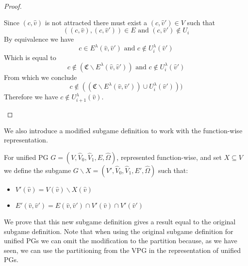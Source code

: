\begin{lemma}
\begin{proof}
\begin{itemize}
			Since $(c,\hat{v})$ is not attracted there must exist a $(c,\hat{v}') \in V$ such that 
			\[ ((c,\hat{v}),(c,\hat{v}')) \in E  \text{ and } (c,\hat{v}') \notin U_i \]
			By equivalence we have 
			\[ c \in E^\lambda(\hat{v},\hat{v}')  \text{ and } c \notin U^\lambda_i(\hat{v}') \]
			Which is equal to
			\[ c \notin (\mathfrak{C} \backslash E^\lambda(\hat{v},\hat{v}'))  \text{ and } c \notin U^\lambda_i(\hat{v}') \]
			From which we conclude
			\[ c \notin ((\mathfrak{C} \backslash E^\lambda(\hat{v},\hat{v}')) \cup U^\lambda_i(\hat{v}'))) \]
			Therefore we have $c \notin U^\lambda_{i+1}(\hat{v})$.
		\end{itemize}
	\end{proof}
\end{lemma}

We also introduce a modified subgame definition to work with the function-wise representation.
\begin{definition}
	\label{def_Usubgame}
	For unified PG $G = (V,\hat{V}_0,\hat{V}_1,E,\hat{\Omega})$, represented function-wise, and set $X \subseteq V$ we define the subgame $G \backslash X = (V',\hat{V}_0,\hat{V}_1,E',\hat{\Omega})$ such that:
	\begin{itemize}
		\item $V'(\hat{v}) = V(\hat{v}) \backslash X(\hat{v})$
		\item $E'(\hat{v},\hat{v}') = E(\hat{v},\hat{v}') \cap V'(\hat{v}) \cap V'(\hat{v}')$
	\end{itemize}
\end{definition}
We prove that this new subgame definition gives a result equal to the original subgame definition. Note that when using the original subgame definition for unified PGs we can omit the modification to the partition because, as we have seen, we can use the partitioning from the VPG in the representation of unified PGs.
